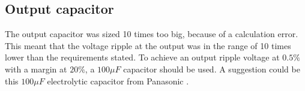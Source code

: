 \subsection{Output capacitor} \label{output_cap_discussion}	
The output capacitor was sized 10 times too big, because of a calculation error. This meant that the voltage ripple at the output was in the range of 10 times lower than the requirements stated. To achieve an output ripple voltage at $0.5\%$ with a margin at $20\%$, a $100\mu F$ capacitor should be used. A suggestion could be this $100 \mu F$ electrolytic capacitor from Panasonic \cite{new_out_cap_datasheet}.